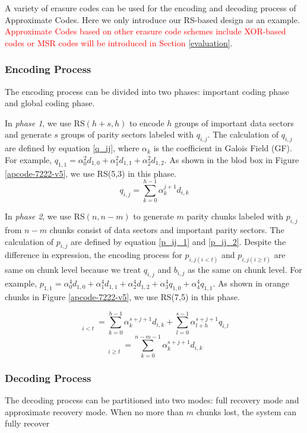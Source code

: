 \documentclass[sigconf]{acmart}
\begin{document}
A variety of erasure codes can be used for the encoding and decoding process of Approximate Codes. Here we only introduce our RS-based design as an example. 
\textcolor{red}{Approximate Codes based on other erasure code schemes include XOR-based codes or MSR codes will be introduced in Section }\ref{evaluation}.

\subsubsection{Encoding Process}
The encoding process can be divided into two phases: important coding phase and global coding phase. 

In \emph{phase 1}, we use RS$(h+s,h)$ to encode $h$ groups of important data sectors and generate $s$ groups of parity sectors labeled with $q_{i,j}$. The calculation of $q_{i,j}$ are defined by equation \ref{q_ij}, where $\alpha_k$ is the coefficient in Galois Field (GF). 
For example, $q_{1,1} = \alpha_0^2 d_{1,0} + \alpha_1^2 d_{1,1} + \alpha_2^2 d_{1,2}$.
As shown in the blod box in Figure \ref{apcode-7222-v5}, we use RS(5,3) in this phase.
\begin{equation}\label{q_ij}
    q_{i,j} = \sum_{k=0}^{h-1} \alpha_k^{j+1} d_{i,k}
\end{equation}

In \emph{phase 2}, we use RS$(n,n-m)$ to generate $m$ parity chunks labeled with $p_{i,j}$ from $n-m$ chunks consist of data sectors and important parity sectors. The calculation of $p_{i,j}$ are defined by equation \ref{p_ij_1} and \ref{p_ij_2}.
Despite the difference in expression, the encoding process for $p_{i,j(i<t)}$ and $p_{i,j(i \geqslant t)}$ are same on chunk level because we treat $q_{i,j}$ and $b_{i,j}$ as the same on chunk level.
For example, $p_{1,1} = \alpha_0^4 d_{1,0} + \alpha_1^4 d_{1,1} + \alpha_2^4 d_{1,2} + \alpha_3^4 q_{1,0} + \alpha_4^4 q_{1,1}$.
As shown in orange chunks in Figure \ref{apcode-7222-v5}, we use RS(7,5) in this phase.

\begin{equation}\label{p_ij_1}
    \mathop{p_{i,j}}\limits_{i<t} = 
    \sum_{k=0}^{h-1} \alpha_k^{s+j+1} d_{i,k} +
    \sum_{l=0}^{s-1} \alpha_{l+h}^{s+j+1} q_{i,l}
\end{equation}
\begin{equation}\label{p_ij_2}
    \mathop{p_{i,j}}\limits_{i \geqslant t} = 
    \sum_{k=0}^{n-m-1} \alpha_k^{s+j+1} d_{i,k}
\end{equation}

\subsubsection{Decoding Process}
The decoding process can be partitioned into two modes: full recovery mode and approximate recovery mode. When no more than $m$ chunks lost, the system can fully recover 
\end{document}
